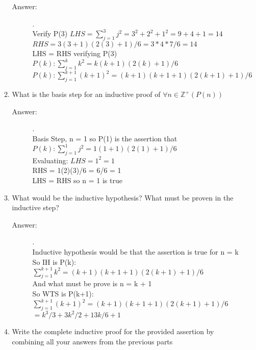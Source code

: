 \documentclass[12pt, oneside]{article}
\begin{document}
\begin{enumerate}
\begin{enumerate}
    \begin{description}
        \item[Answer:] .\\
        Verify P(3) $LHS = \sum_{j=1}^{3} j^2 = 3^2 + 2^2 + 1^2 = 9 + 4 + 1 = 14$\\
        $RHS = 3(3 + 1)(2(3) + 1)/6 = 3*4*7/6 = 14$\\
        LHS = RHS verifying P(3)\\
        $P(k): \sum_{j=1}^{k} k^2 = k(k + 1)(2(k) + 1)/6$\\
        $P(k): \sum_{j=1}^{k+1} (k+1)^2 = (k+1)(k + 1 + 1)(2(k+ 1) + 1)/6$ \\
    \end{description}

    \item What is the basis step for an inductive proof of $\forall n \in \mathbb{Z^+}(P(n))$
    
    \begin{description}
        \item[Answer:] .\\
        Basis Step, n = 1 so P(1) is the assertion that\\
        $P(k): \sum_{j=1}^{1} j^2 = 1(1 + 1)(2(1) + 1)/6  $\\
        Evaluating: $LHS = 1^2 = 1$\\
        RHS = 1(2)(3)/6 = 6/6 = 1\\
        LHS = RHS so n = 1 is true
    \end{description}
    
    \item What would be the inductive hypothesis? What must be proven in the inductive step?
    
    \begin{description}
        \item[Answer:] .\\
        Inductive hypothesis would be that the assertion is true for n = k\\
        So IH is P(k): $\sum_{j=1}^{k+1} k^2 = (k+1)(k + 1 + 1)(2(k+ 1) + 1)/6 $\\
        And what must be prove is n = k + 1\\
        So WTS is P(k+1): $\sum_{j=1}^{k+1} (k+1)^2 = (k+1)(k + 1 + 1)(2(k+ 1) + 1)/6 $\\
        $= k^3/3 + 3k^2/2 + 13k/6 + 1$
    \end{description}

    \item Write the complete inductive proof for the provided assertion by combining all your answers from the previous parts
\end{enumerate}


\end{enumerate}
\end{document}
